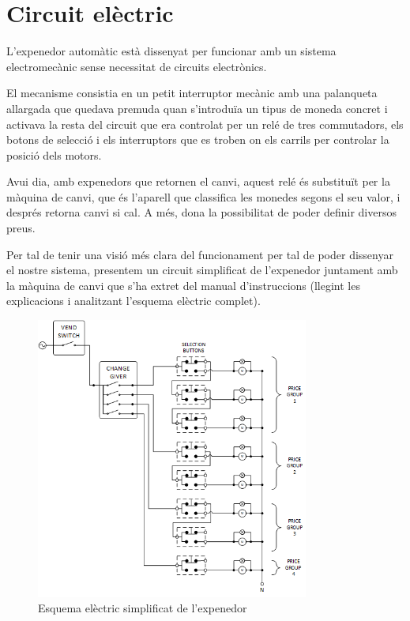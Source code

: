 \section{Circuit elèctric}
L'expenedor automàtic està dissenyat per funcionar amb un sistema electromecànic sense necessitat de circuits electrònics.

El mecanisme consistia en un petit interruptor mecànic amb una palanqueta allargada que quedava premuda quan s'introduïa un tipus de moneda concret i activava la resta del circuit que era controlat per un relé de tres commutadors, els botons de selecció i els interruptors que es troben on els carrils per controlar la posició dels motors.

Avui dia, amb expenedors que retornen el canvi, aquest relé és substituït per la màquina de canvi, que és l'aparell que classifica les monedes segons el seu valor, i després retorna canvi si cal. A més, dona la possibilitat de poder definir diversos preus.

Per tal de tenir una visió més clara del funcionament per tal de poder dissenyar el nostre sistema, presentem un circuit simplificat de l'expenedor juntament amb la màquina de canvi que s'ha extret del manual d'instruccions (llegint les explicacions i analitzant l'esquema elèctric complet).

\begin{figure}[H]
\center
\includegraphics[width=0.8\textwidth]{images/vender_electrical}
\caption{Esquema elèctric simplificat de l'expenedor}
\label{fig:vender_electrical}
\end{figure}

